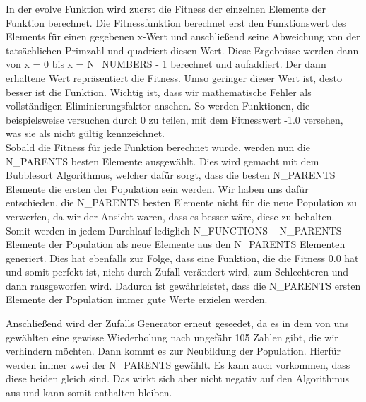 \documentclass[a4paper,12pt]{article}
\begin{document}
In der evolve Funktion wird zuerst die Fitness der einzelnen Elemente der Funktion berechnet. Die Fitnessfunktion berechnet erst den Funktionswert des Elements für einen gegebenen x-Wert und anschließend seine Abweichung von der tatsächlichen Primzahl und quadriert diesen Wert. Diese Ergebnisse werden dann von x = 0 bis x = N\_NUMBERS - 1 berechnet und aufaddiert. Der dann erhaltene Wert repräsentiert die Fitness. Umso geringer dieser Wert ist, desto besser ist die Funktion. Wichtig ist, dass wir mathematische Fehler als vollständigen Eliminierungsfaktor ansehen. So werden Funktionen, die beispielsweise versuchen durch 0 zu teilen, mit dem Fitnesswert -1.0 versehen, was sie als nicht gültig kennzeichnet. \\

Sobald die Fitness für jede Funktion berechnet wurde, werden nun die N\_PARENTS besten Elemente ausgewählt. Dies wird gemacht mit dem Bubblesort Algorithmus, welcher dafür sorgt, dass die besten N\_PARENTS Elemente die ersten der Population sein werden. 
Wir haben uns dafür entschieden, die N\_PARENTS besten Elemente nicht für die neue Population zu verwerfen, da wir der Ansicht waren, dass es besser wäre, diese zu behalten. Somit werden in jedem Durchlauf lediglich N\_FUNCTIONS – N\_PARENTS Elemente der Population als neue Elemente aus den N\_PARENTS Elementen generiert. Dies hat ebenfalls zur Folge, dass eine Funktion, die die Fitness 0.0 hat und somit perfekt ist, nicht durch Zufall verändert wird, zum Schlechteren und dann rausgeworfen wird. Dadurch ist gewährleistet, dass die N\_PARENTS ersten Elemente der Population immer gute Werte erzielen werden. 

Anschließend wird der Zufalls Generator erneut geseedet, da es in dem von uns gewählten eine gewisse Wiederholung nach ungefähr 10\^5 Zahlen gibt, die wir verhindern möchten. Dann kommt es zur Neubildung der Population. Hierfür werden immer zwei der N\_PARENTS gewählt. Es kann auch vorkommen, dass diese beiden gleich sind. Das wirkt sich aber nicht negativ auf den Algorithmus aus und kann somit enthalten bleiben. 
\end{document}
